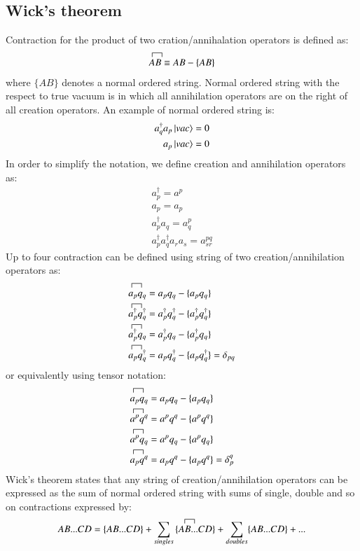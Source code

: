 \documentclass[journal=jacsat]{achemso}
\numberwithin{equation}{section}
\begin{document}
\subsection{Wick's theorem} 
Contraction for the product of two cration/annihalation operators is defined as:
\begin{align}
\contraction{}{A}{B}{}
AB\equiv AB - \{AB\}
\end{align}
where $\{AB\}$ denotes a normal ordered string. Normal ordered string with the respect to true vacuum is in which all annihilation operators are on the right of all creation operators.
An example of normal ordered string is:
\begin{align}
a_{q}^{\dagger}a_{p}\ket{vac}=0\\
a_{p}\ket{vac}=0
\end{align}  
In order to simplify the notation, we define creation and annihilation operators as:
\begin{align}
a_{p}^{\dagger}=a^{p} \\
a_{p}=a_{p}\\
a_{p}^{\dagger}a_{q}=a_{q}^{p}\\
a_{p}^{\dagger}a_{q}^{\dagger}a_{r}a_{s}=a^{pq}_{sr}
\end{align} 
Up to four contraction can be defined using string of two creation/annihilation operators as:
\begin{align}
\contraction{}{A}{B}{}
a_{p}q_{q}&= a_{p}q_{q} - \{a_{p}q_{q}\}\\
\contraction{}{A}{B}{}
a_{p}^{\dagger}q_{q}^{\dagger}&= a_{p}^{\dagger}q_{q}^{\dagger} - \{a_{p}^{\dagger}q_{q}^{\dagger}\}\\
\contraction{}{A}{B}{}
a_{p}^{\dagger}q_{q}&= a_{p}^{\dagger}q_{q} - \{a_{p}^{\dagger}q_{q}\}\\
\contraction{}{A}{B}{}
a_{p}q_{q}^{\dagger}&= a_{p}q_{q}^{\dagger} - \{a_{p}q_{q}^{\dagger}\}=\delta_{pq}
\end{align} 
or equivalently using tensor notation:
\begin{align}
\contraction{}{A}{B}{}
a_{p}q_{q}&= a_{p}q_{q} - \{a_{p}q_{q}\}\\
\contraction{}{A}{B}{}
a^{p}q^{q}&= a^{p}q^{q} - \{a^{p}q^{q}\}\\
\contraction{}{A}{B}{}
a^{p}q_{q}&= a^{p}q_{q} - \{a^{p}q_{q}\}\\
\contraction{}{A}{B}{}
a_{p}q^{q}&= a_{p}q^{q} - \{a_{p}q^{q}\}=\delta_{p}^{q}
\end{align}
Wick's theorem states that any string of creation/annihilation operators can be expressed as the sum of normal ordered string with sums of single, double and so on contractions expressed by:
\begin{align}
AB...CD = \{AB...CD\}+
\sum_{singles}
\contraction{A}{B}{B}{}
\{AB...CD\}+\sum_{doubles}\{AB...CD\}+...
\end{align}
\end{document}
